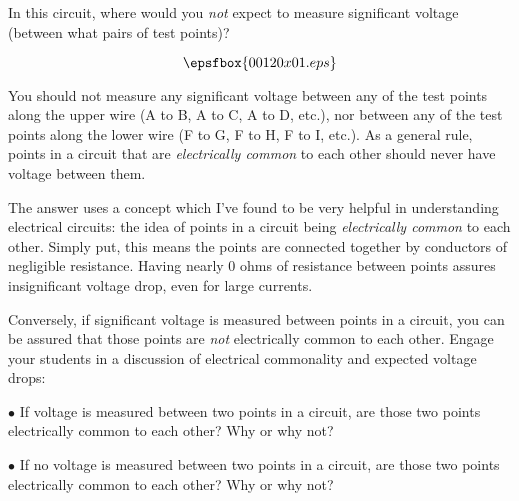 

In this circuit, where would you {\it not} expect to measure significant voltage (between what pairs of test points)?

$$\epsfbox{00120x01.eps}$$







You should not measure any significant voltage between any of the test points along the upper wire (A to B, A to C, A to D, etc.), nor between any of the test points along the lower wire (F to G, F to H, F to I, etc.).  As a general rule, points in a circuit that are {\it electrically common} to each other should never have voltage between them.







The answer uses a concept which I've found to be very helpful in understanding electrical circuits: the idea of points in a circuit being {\it electrically common} to each other.  Simply put, this means the points are connected together by conductors of negligible resistance.  Having nearly 0 ohms of resistance between points assures insignificant voltage drop, even for large currents.

Conversely, if significant voltage is measured between points in a circuit, you can be assured that those points are {\it not} electrically common to each other.  Engage your students in a discussion of electrical commonality and expected voltage drops: 

\vskip 10pt

\item {$\bullet$} If voltage is measured between two points in a circuit, are those two points electrically common to each other?  Why or why not?
\item {$\bullet$} If no voltage is measured between two points in a circuit, are those two points electrically common to each other?  Why or why not?




